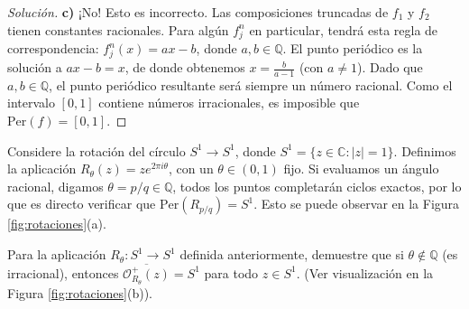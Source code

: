 \begin{proof}[Solución]
	\textbf{c)} ¡No! Esto es incorrecto. Las composiciones truncadas de $f_1$ y $f_2$ tienen constantes racionales. Para algún $f^n_j$ en particular, tendrá esta regla de correspondencia: $f^n_j(x) = ax - b$, donde $a, b \in \mathbb{Q}$. El punto periódico es la solución a $ax - b = x$, de donde obtenemos $x = \frac{b}{a-1}$ (con $a \neq 1$). 
	Dado que $a,b \in \mathbb{Q}$, el punto periódico resultante será siempre un número racional. Como el intervalo $[0,1]$ contiene números irracionales, es imposible que $\text{Per}(f) = [0,1]$.
\end{proof}

\begin{ejemplo}
	Considere la rotación del círculo $S^1 \to S^1$, donde $S^1 = \{z \in \mathbb{C} : |z| = 1\}$. Definimos la aplicación $R_\theta(z) = z e^{2\pi i \theta}$, con un $\theta \in (0,1)$ fijo.
	Si evaluamos un ángulo racional, digamos $\theta = p/q \in \mathbb{Q}$, todos los puntos completarán ciclos exactos, por lo que es directo verificar que $\text{Per}(R_{p/q}) = S^1$. Esto se puede observar en la Figura \ref{fig:rotaciones}(a).
\end{ejemplo}

\begin{ejercicio}
	Para la aplicación $R_\theta: S^1 \to S^1$ definida anteriormente, demuestre que si $\theta \notin \mathbb{Q}$ (es irracional), entonces $\overline{\mathcal{O}^+_{R_\theta}(z)} = S^1$ para todo $z \in S^1$. (Ver visualización en la Figura \ref{fig:rotaciones}(b)).
\end{ejercicio}

